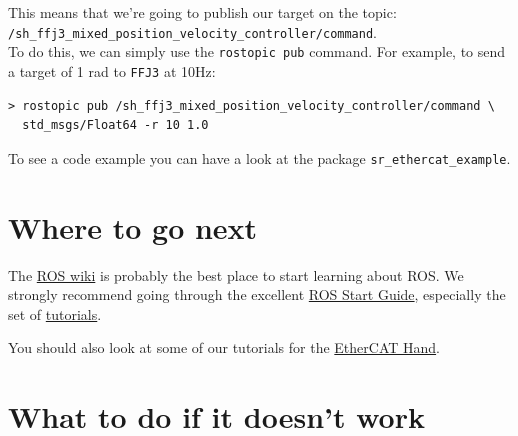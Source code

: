 \documentclass[12pt]{article}
\begin{document}
\par This means that we're going to publish our target on the topic:\\
\hspace*{40pt} \texttt{/sh\_ffj3\_mixed\_position\_velocity\_controller/command}.\\
To do this, we can simply use the \texttt{rostopic pub} command. For example, to send a target of 1 rad to \texttt{FFJ3} at 10Hz:
  \begin{lstlisting}[escapeinside='']
> rostopic pub /sh_ffj3_mixed_position_velocity_controller/command \
  std_msgs/Float64 -r 10 1.0
  \end{lstlisting}

\par To see a code example you can have a look at the package \texttt{sr\_ethercat\_example}.

\newpage

\section{Where to go next}
\label{sec:where-to-go}
\par The \href{http://ros.org/wiki}{ROS wiki} is probably the best place to start learning about ROS. We strongly recommend going through the excellent \href{http://ros.org/wiki/ROS/StartGuide}{ROS Start Guide}, especially the set of \href{http://ros.org/wiki/ROS/Tutorials}{tutorials}.

\par You should also look at some of our tutorials for the \href{http://ros.org/wiki/shadow_robot_etherCAT/Tutorials}{EtherCAT Hand}.
\newpage

\section{What to do if it doesn't work}
\label{sec:what-do-if}
\end{document}
